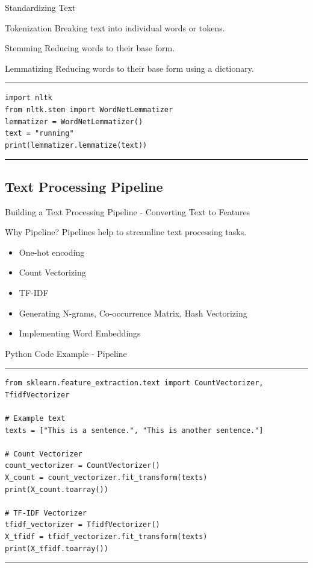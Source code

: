 \documentclass[aspectratio=169, hideothersubsections]{beamer}
\begin{document}
\begin{frame}[fragile]{Standardizing Text}
  \begin{block}{Tokenization}
    Breaking text into individual words or tokens.
  \end{block}
  \begin{block}{Stemming}
    Reducing words to their base form.
  \end{block}
  \begin{block}{Lemmatizing}
    Reducing words to their base form using a dictionary.
  \end{block}
\rule{\textwidth}{1pt}
\scriptsize
\begin{verbatim}
import nltk
from nltk.stem import WordNetLemmatizer
lemmatizer = WordNetLemmatizer()
text = "running"
print(lemmatizer.lemmatize(text))
\end{verbatim}
\rule{\textwidth}{1pt}
\end{frame}

\subsection{Text Processing Pipeline}
\begin{frame}{Building a Text Processing Pipeline - Converting Text to Features}
\begin{block}{Why Pipeline?}
    Pipelines help to streamline text processing tasks.
\end{block}
  \begin{itemize}
    \item One-hot encoding
    \item Count Vectorizing
    \item TF-IDF
    \item Generating N-grams, Co-occurrence Matrix, Hash Vectorizing
    \item Implementing Word Embeddings
  \end{itemize}
\end{frame}

\begin{frame}[fragile]{Python Code Example - Pipeline}
\rule{\textwidth}{1pt}
\scriptsize
\begin{verbatim}
from sklearn.feature_extraction.text import CountVectorizer, TfidfVectorizer

# Example text
texts = ["This is a sentence.", "This is another sentence."]

# Count Vectorizer
count_vectorizer = CountVectorizer()
X_count = count_vectorizer.fit_transform(texts)
print(X_count.toarray())

# TF-IDF Vectorizer
tfidf_vectorizer = TfidfVectorizer()
X_tfidf = tfidf_vectorizer.fit_transform(texts)
print(X_tfidf.toarray())
\end{verbatim}
\rule{\textwidth}{1pt}
\end{frame}
\end{document}
